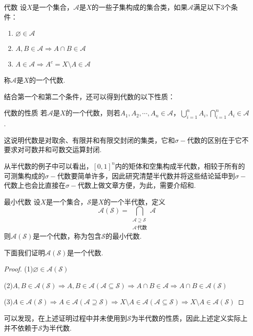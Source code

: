 \begin{definition}{代数}
    设$X$是一个集合，$\mathcal{A}$是$X$的一些子集构成的集合类，如果$\mathcal{A}$满足以下3个条件：
    \begin{enumerate}
        \item $\varnothing\in\mathcal{A}$
        \item $A,B\in\mathcal{A}\Rightarrow A\cap B\in\mathcal{A}$
        \item $A\in\mathcal{A}\Rightarrow A^c=X\setminus A\in\mathcal{A}$
    \end{enumerate}
    称$\mathcal{A}$是$X$的一个代数.
\end{definition}
结合第一个和第二个条件，还可以得到代数的以下性质：
\begin{proposition}{代数的性质}
    若$\mathcal{A}$是$X$的一个代数，则若$A_1,A_2,\cdots,A_n\in\mathcal{A}$，$\bigcup_{i=1}^n{A_i},\bigcap_{i=1}^n{A_i}\in\mathcal{A}$.
\end{proposition}
这说明代数是对取余、有限并和有限交封闭的集类，它和$\sigma-$代数的区别在于它不要求对可数并和可数交运算封闭.\par
从半代数的例子中可以看出，$[0,1]^n$内的矩体和空集构成半代数，相较于所有的可测集构成的$\sigma-\text{代数}$要简单许多，因此研究清楚半代数并将这些结论延申到$\sigma-$代数上也会比直接在$\sigma-$代数上做文章方便，为此，需要介绍和.\par
\begin{definition}{最小代数}
    设$X$是一个集合，$\mathcal{S}$是$X$的一个半代数，定义\[\mathcal{A}(\mathcal{S})=\bigcap_{\substack{\mathcal{A}\supseteq\mathcal{S}\\\mathcal{A}\,\text{代数}}}{\mathcal{A}}\]
    则$\mathcal{A}(\mathcal{S})$是一个代数，称为包含$\mathcal{S}$的最小代数.
\end{definition}
下面我们证明$\mathcal{A}(\mathcal{S})$是一个代数.
\begin{proof}
    (1)$\varnothing\in\mathcal{A}(\mathcal{S})$\par
    (2)$A,B\in\mathcal{A}(\mathcal{S})\Rightarrow A,B\in\mathcal{A}(\mathcal{A}\subseteq\mathcal{S}) \Rightarrow A\cap B\in\mathcal{A}\Rightarrow A\cap B\in\mathcal{A}(\mathcal{S})$\par
    (3)$A\in\mathcal{A}(\mathcal{S})\Rightarrow A\in\mathcal{A}(\mathcal{A}\supseteq\mathcal{S}) \Rightarrow X\setminus A\in\mathcal{A}(\mathcal{A}\subseteq\mathcal{S})\Rightarrow X\setminus A\in\mathcal{A}(\mathcal{S})$
\end{proof}
\begin{remark}
    可以发现，在上述证明过程中并未使用到$\mathcal{S}$为半代数的性质，因此上述定义实际上并不依赖于$\mathcal{S}$为半代数.
\end{remark}
